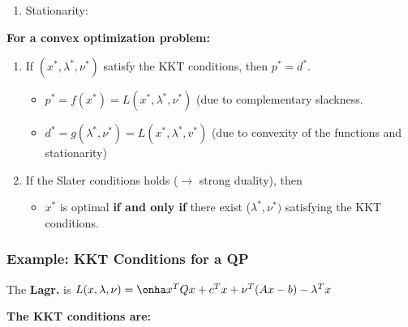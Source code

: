 \documentclass[8pt,a4paper]{scrartcl}
\begin{document}
\begin{multicols*}{3}
\begin{multicols*}{4}
\begin{enumerate}
\item Stationarity:

\end{enumerate}

\finn

\textbf{For a convex optimization problem:}

\begin{enumerate}

\item If $(x^\ast,\lambda^\ast,\nu^\ast)$ satisfy the KKT conditions, then $p^\ast=d^\ast$.
\begin{itemize}
\item $p^\ast=f(x^\ast)=L(x^\ast,\lambda^\ast,\nu^\ast)$ (due to complementary slackness.
\item $d^\ast=g(\lambda^\ast,\nu^\ast)=L(x^\ast,\lambda^\ast,v^\ast)$ (due to convexity of the functions and stationarity)
\end{itemize}
\item If the Slater conditions holds ($\rightarrow$ strong duality), then
\begin{itemize}
\item $x^\ast$ is optimal \textbf{if and only if} there exist ($\lambda^\ast,\nu^\ast)$ satisfying the KKT conditions.
\end{itemize}
\end{enumerate}

\subsubsection{Example: KKT Conditions for a QP}



The \textbf{Lagr.} is $L(x,\lambda,\nu)=\onha x^TQx+c^Tx+\nu^T(Ax-b)-\lambda^Tx$

\textbf{The KKT conditions are:}



\end{multicols*}
\end{multicols*}
\end{document}
